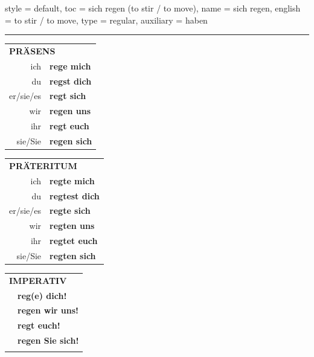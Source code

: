 \begin{verbentry}{
  style = {default},
  toc = {sich regen (to stir / to move)},
  name = {sich regen},
  english = {to stir / to move},
  type = {regular},
  auxiliary = {haben}
}
 
    
     \vspace{5pt}

    \hrule
    
    \vspace{5pt}

  \begin{tabular}{rl}
     \multicolumn{2}{l}{\textbf{PRÄSENS} }\\
    ich & \textbf{rege mich}\\
    du & \textbf{regst dich}\\
    er/sie/es & \textbf{regt sich}\\
    wir & \textbf{regen uns}\\
    ihr & \textbf{regt euch}\\
    sie/Sie & \textbf{regen sich}\\
  \end{tabular}
  \hfill
     \begin{tabular}{rl}
    \multicolumn{2}{l}{\textbf{PRÄTERITUM} }\\
    ich & \textbf{regte mich}\\
    du & \textbf{regtest dich}\\
    er/sie/es & \textbf{regte sich}\\
    wir & \textbf{regten uns}\\
    ihr & \textbf{regtet euch}\\
    sie/Sie & \textbf{regten sich}\\
  \end{tabular}
  \hfill
  \begin{tabular}{rl}
     \multicolumn{2}{l}{\textbf{IMPERATIV} }\\
   & \textbf{reg(e) dich!}\\
   & \textbf{regen wir uns!}\\
   & \textbf{regt euch!}\\
   & \textbf{regen Sie sich!}\\
   & \vspace{10pt}
  \end{tabular}

    \vspace{10pt}


\end{verbentry}
